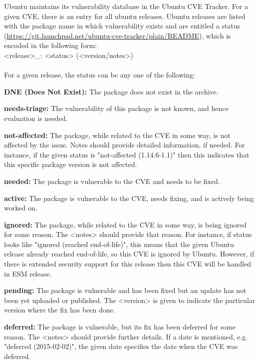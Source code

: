 \documentclass[a4paper,num-refs]{oup-contemporary}
\begin{document}
Ubuntu maintains its vulnerability database in the Ubuntu CVE Tracker. For a given CVE, there is an entry for all ubuntu releases.
Ubuntu releases are listed with the package name
in which vulnerability exists and are entitled a status
(\url{https://git.launchpad.net/ubuntu-cve-tracker/plain/README}), which is
encoded in the following form:
\newline \\
\noindent <release>\_<source-package>: <status> (<version/notes>) \\
\newline\\
For a given release, the status can be any one of the following:

\textbf{DNE (Does Not Exist):} The package does not exist in the
		archive.

\textbf{needs-triage:} The vulnerability of this package
		is not known, and hence evaluation is needed.

\textbf{not-affected:} The package, while related to the
		CVE in some way, is not affected by the issue. Notes should
		provide detailed information, if needed. For instance, if the given
		status is "not-affected (1.14.6-1.1)" then this indicates that this specific
		package version is not affected.

\textbf{needed:} The package is vulnerable to the
		CVE and needs to be fixed.

\textbf{active:} The package is vulnerable to the
		CVE, needs fixing, and is actively being worked on.

\textbf{ignored:} The package, while related to the
		CVE in some way, is being ignored for some reason. The
		<notes> should provide that reason. For instance, if status looks like
		"ignored (reached end-of-life)", this means that the given Ubuntu release already reached
		end-of-life, so this CVE is ignored by Ubuntu. However, if there
		is extended security support for this release then this
		CVE will be handled in ESM release.

\textbf{pending:} The package is vulnerable and
                  has been fixed but an update has not been yet uploaded or
		  published. The <version> is given to indicate the particular 
		  version where the fix has been done.

\textbf{deferred:} The package is vulnerable, but 
                   its fix has been deferred for some reason. The <notes>
		   should provide further details. If a date is mentioned, e.g.
		   "deferred (2015-02-02)", the given date specifies the date when
		   the CVE was deferred.
\end{document}
